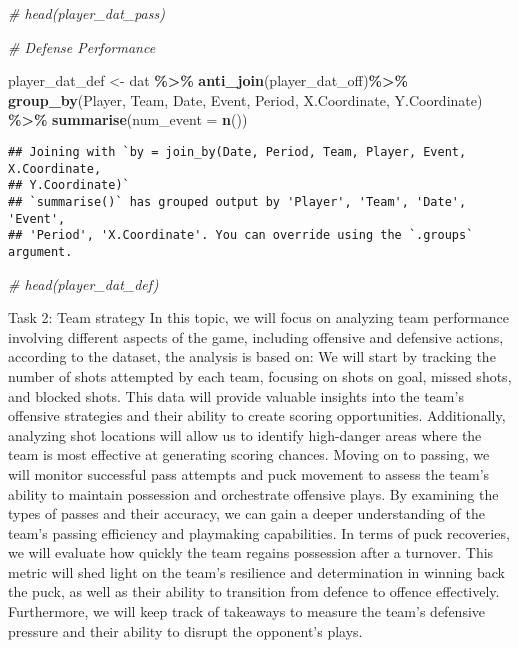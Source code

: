 \documentclass[
  a3paper,
]{article}
\newenvironment{Shaded}{\begin{snugshade}}{\end{snugshade}}
\newcommand{\AttributeTok}[1]{\textcolor[rgb]{0.13,0.29,0.53}{#1}}
\newcommand{\CommentTok}[1]{\textcolor[rgb]{0.56,0.35,0.01}{\textit{#1}}}
\newcommand{\FunctionTok}[1]{\textcolor[rgb]{0.13,0.29,0.53}{\textbf{#1}}}
\newcommand{\NormalTok}[1]{#1}
\newcommand{\OtherTok}[1]{\textcolor[rgb]{0.56,0.35,0.01}{#1}}
\newcommand{\SpecialCharTok}[1]{\textcolor[rgb]{0.81,0.36,0.00}{\textbf{#1}}}
\begin{document}
\begin{Shaded}
\begin{Highlighting}[]
\CommentTok{\# head(player\_dat\_pass)}


\CommentTok{\# Defense Performance}

\NormalTok{player\_dat\_def }\OtherTok{\textless{}{-}}\NormalTok{ dat }\SpecialCharTok{\%\textgreater{}\%} 
  \FunctionTok{anti\_join}\NormalTok{(player\_dat\_off)}\SpecialCharTok{\%\textgreater{}\%} 
  \FunctionTok{group\_by}\NormalTok{(Player, Team, Date, Event, Period, X.Coordinate, Y.Coordinate) }\SpecialCharTok{\%\textgreater{}\%}
  \FunctionTok{summarise}\NormalTok{(}\AttributeTok{num\_event =} \FunctionTok{n}\NormalTok{())}
\end{Highlighting}
\end{Shaded}

\begin{verbatim}
## Joining with `by = join_by(Date, Period, Team, Player, Event, X.Coordinate,
## Y.Coordinate)`
## `summarise()` has grouped output by 'Player', 'Team', 'Date', 'Event',
## 'Period', 'X.Coordinate'. You can override using the `.groups` argument.
\end{verbatim}

\begin{Shaded}
\begin{Highlighting}[]
\CommentTok{\# head(player\_dat\_def)}
\end{Highlighting}
\end{Shaded}

Task 2: Team strategy In this topic, we will focus on analyzing team
performance involving different aspects of the game, including offensive
and defensive actions, according to the dataset, the analysis is based
on: We will start by tracking the number of shots attempted by each
team, focusing on shots on goal, missed shots, and blocked shots. This
data will provide valuable insights into the team's offensive strategies
and their ability to create scoring opportunities. Additionally,
analyzing shot locations will allow us to identify high-danger areas
where the team is most effective at generating scoring chances. Moving
on to passing, we will monitor successful pass attempts and puck
movement to assess the team's ability to maintain possession and
orchestrate offensive plays. By examining the types of passes and their
accuracy, we can gain a deeper understanding of the team's passing
efficiency and playmaking capabilities. In terms of puck recoveries, we
will evaluate how quickly the team regains possession after a turnover.
This metric will shed light on the team's resilience and determination
in winning back the puck, as well as their ability to transition from
defence to offence effectively. Furthermore, we will keep track of
takeaways to measure the team's defensive pressure and their ability to
disrupt the opponent's plays.\\
\end{document}
